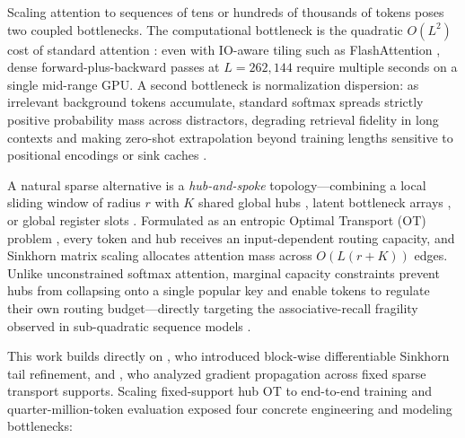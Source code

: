 \documentclass[11pt]{article}
\begin{document}
Scaling attention to sequences of tens or hundreds of thousands of tokens poses two coupled bottlenecks. The computational bottleneck is the quadratic $O(L^2)$ cost of standard attention \citep{vaswani2017attention}: even with IO-aware tiling such as FlashAttention \citep{dao2022flashattention,dao2023flashattention2,shah2024flashattention3}, dense forward-plus-backward passes at $L=262{,}144$ require multiple seconds on a single mid-range GPU. A second bottleneck is normalization dispersion: as irrelevant background tokens accumulate, standard softmax spreads strictly positive probability mass across distractors, degrading retrieval fidelity in long contexts \citep{liu2024lost,hsieh2024ruler,velickovic2025softmax,vasylenko2025longcontext} and making zero-shot extrapolation beyond training lengths sensitive to positional encodings or sink caches \citep{press2022train,peng2024yarn,xiao2024efficient}.

A natural sparse alternative is a \emph{hub-and-spoke} topology---combining a local sliding window of radius $r$ with $K$ shared global hubs \citep{beltagy2020longformer,zaheer2020bigbird}, latent bottleneck arrays \citep{jaegle2021perceiver}, or global register slots \citep{darcet2024vision}. Formulated as an entropic Optimal Transport (OT) problem \citep{cuturi2013sinkhorn,peyre2019computational,tay2020sparse,sander2022sinkformers,shahbazi2025lotformer}, every token and hub receives an input-dependent routing capacity, and Sinkhorn matrix scaling allocates attention mass across $O(L(r+K))$ edges. Unlike unconstrained softmax attention, marginal capacity constraints prevent hubs from collapsing onto a single popular key and enable tokens to regulate their own routing budget---directly targeting the associative-recall fragility observed in sub-quadratic sequence models \citep{arora2024zoology}.

This work builds directly on \citet{forde2026blockwise}, who introduced block-wise differentiable Sinkhorn tail refinement, and \citet{forde2026topology}, who analyzed gradient propagation across fixed sparse transport supports. Scaling fixed-support hub OT to end-to-end training and quarter-million-token evaluation exposed four concrete engineering and modeling bottlenecks:
\end{document}
